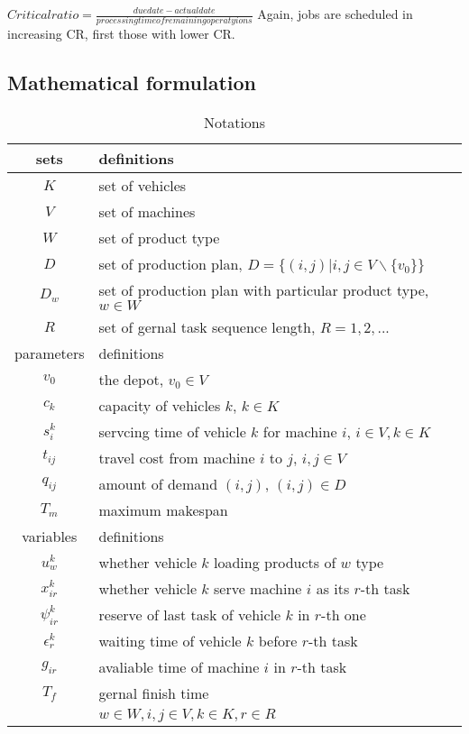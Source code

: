 \documentclass[preprint,12pt,authoryear]{elsarticle}
\begin{document}
$Critical ratio=\frac{due date - actual date }{processing time of remaining operatyions}$
Again, jobs are scheduled in increasing CR, first those with lower CR.


\subsection{Mathematical formulation}

\begin{longtable}{cl}%
    \caption{Notations}\label{tab1}\\
    \toprule [2pt] %
    sets& definitions \\
    \midrule [1pt]  
    $K$& set of vehicles \\
    $V$& set of machines \\
    $W$& set of product type \\
    $D$& set of   production plan,
    $D=\{(i,j)|i,j\in V\backslash \{v_0\}\}$\\
    $D_w$& set of production plan with particular product type, $w \in W$ \\
    $R$& set of gernal task sequence length, $R={1,2,...}$ \\
    \midrule [1pt]     
    parameters & definitions  \\ %
    \midrule [1pt]
    $v_0$& the depot, $v_0\in V$ \\
    $c_k$& capacity of vehicles $k$, $k\in K$ \\
    $s_i^k$& servcing time of vehicle $k$ for machine $i$, $i\in V,k\in K$ \\
    $t_{ij}$& travel cost from machine $i$ to $j$, $i,j\in V$ \\ 
    $q_{ij}$& amount of demand $(i,j)$, $(i,j)\in D$ \\
    $T_m$& maximum makespan \\
    \midrule[1pt]
    variables & definitions \\
    \midrule[1pt]
    $u_w^k$& whether vehicle $k$ loading products of $w$ type \\
    $x_{ir}^k$& whether vehicle $k$ serve machine $i$ as its $r$-th task \\
    $\psi_{ir}^k$& reserve of last task of vehicle $k$ in $r$-th one \\
    $\epsilon_r^k$& waiting time of vehicle $k$ before $r$-th task \\
    $g_{ir}$& avaliable time of machine $i$ in $r$-th task \\
    $T_f$& gernal finish time \\
    & $w\in W,i,j\in V,k\in K,r\in R$\\
    \bottomrule [2pt]
\end{longtable}
\end{document}
